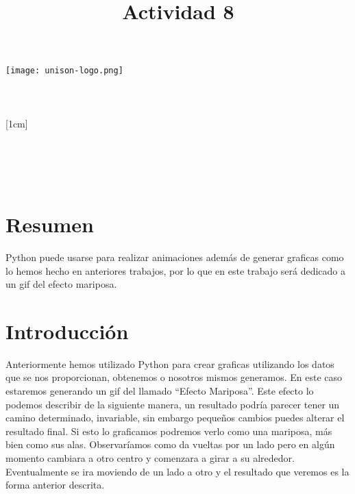 \documentclass[a4paper,12pt]{article}
\title{Actividad 8}
\author{}
\newcommand{\vacio}{\textcolor{white}{holacaracola}}
\newcommand{\director}{Carlos Lizárraga Celaya}
\begin{document}
\begin{titlepage}
\begin{center}
\vspace{1cm}

\texttt{[image: unison-logo.png]}
\\[0.5cm]
{\fontsize{24}{6}\selectfont{UNIVERSIDAD DE SONORA}}\\
[1em]
{\fontsize{16}{5}\selectfont{DEPARTAMENTO DE FÍSICA}}\\
[4em]
\textcolor{azulportada}
{\fontsize{30}{5}\selectfont{\textsc{\thetitle}}}\\
[1cm]
{\fontsize{16}{5}\selectfont{Alumno:}}\\
[0.2cm]
{\fontsize{14}{5}\selectfont{Luis Alfonso Torres Flores}}\\
[1cm]
{\fontsize{16}{5}\selectfont{Profesor}}\\
[0.2cm]
{\fontsize{16}{5}\selectfont{\director}}\\
[4.5cm]
{\fontsize{14}{5}\selectfont{26 de Abril de 2017}}\\
[4cm]
\end{center}
\restoregeometry
\end{titlepage}

\newpage
\renewcommand{\headrulewidth}{0.5pt}
\fancyhead[L]{\vacio}
\newpage
\section*{Resumen}
\noindent
Python puede usarse para realizar animaciones además de generar graficas como lo hemos hecho en anteriores trabajos, por lo que en este trabajo será dedicado a un gif del efecto mariposa.
	
\section*{Introducción}
\noindent
Anteriormente hemos utilizado Python para crear graficas utilizando los datos que se nos proporcionan, obtenemos o nosotros mismos generamos. En este caso estaremos generando un gif del llamado “Efecto Mariposa”. Este efecto lo podemos describir de la siguiente manera, un resultado podría parecer tener un camino determinado, invariable, sin embargo pequeños cambios puedes alterar el resultado final. Si esto lo graficamos podremos verlo como una mariposa, más bien como sus alas. Observaríamos como da vueltas por un lado pero en algún momento cambiara a otro centro y comenzara a girar a su alrededor. Eventualmente se ira moviendo de un lado a otro y el resultado que veremos es la forma anterior descrita.
\end{document}
